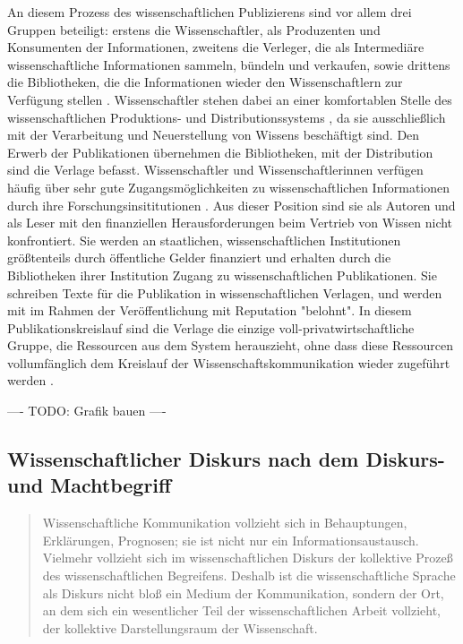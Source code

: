\begin{enumerate}
\begin{end}
An diesem Prozess des wissenschaftlichen Publizierens sind vor allem drei Gruppen beteiligt: erstens die Wissenschaftler, als Produzenten und Konsumenten der Informationen, zweitens die Verleger, die als Intermediäre wissenschaftliche Informationen sammeln, bündeln und verkaufen, sowie drittens die Bibliotheken, die die Informationen wieder den Wissenschaftlern zur Verfügung stellen \cite{Odlyzko_1997}. Wissenschaftler stehen dabei an einer komfortablen Stelle des wissenschaftlichen Produktions- und Distributionssystems \cite{herb_2010}, da sie ausschließlich mit der Verarbeitung und Neuerstellung von Wissens beschäftigt sind. Den Erwerb der Publikationen übernehmen die Bibliotheken, mit der Distribution sind die Verlage befasst. Wissenschaftler und Wissenschaftlerinnen verfügen häufig über sehr gute Zugangsmöglichkeiten zu wissenschaftlichen Informationen durch ihre Forschungsinsititutionen \cite{cope2014future}. Aus dieser Position sind sie als Autoren und als Leser mit den finanziellen Herausforderungen beim Vertrieb von Wissen nicht konfrontiert. Sie werden an staatlichen, wissenschaftlichen Institutionen größtenteils durch öffentliche Gelder finanziert und erhalten durch die Bibliotheken ihrer Institution Zugang zu wissenschaftlichen Publikationen. Sie schreiben Texte für die Publikation in wissenschaftlichen Verlagen, und werden mit im Rahmen der Veröffentlichung mit Reputation "belohnt". In diesem Publikationskreislauf sind die Verlage die einzige voll-privatwirtschaftliche Gruppe, die Ressourcen aus dem System herauszieht, ohne dass diese Ressourcen vollumfänglich dem Kreislauf der Wissenschaftskommunikation wieder zugeführt werden \cite{kiley_2006_open}.

---- TODO: Grafik bauen ----

\subsection{Wissenschaftlicher Diskurs nach dem Diskurs- und Machtbegriff}

\begin{quote}Wissenschaftliche Kommunikation vollzieht sich in Behauptungen, Erklärungen, Prognosen; sie ist nicht nur ein Informationsaustausch. Vielmehr vollzieht sich im wissenschaftlichen Diskurs der kollektive Prozeß des wissenschaftlichen Begreifens. Deshalb ist die wissenschaftliche Sprache als Diskurs nicht bloß ein Medium der Kommunikation, sondern der Ort, an dem sich ein wesentlicher Teil der wissenschaftlichen Arbeit vollzieht, der kollektive Darstellungsraum der Wissenschaft. \cite{bohme_1978_wissenschaftssprachen}\end{quote}


\end{end}
\end{enumerate}
